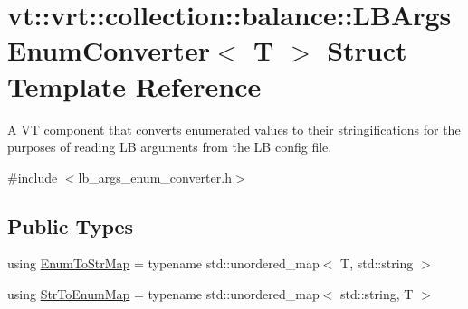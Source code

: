 \hypertarget{structvt_1_1vrt_1_1collection_1_1balance_1_1_l_b_args_enum_converter}{}\section{vt\+:\+:vrt\+:\+:collection\+:\+:balance\+:\+:L\+B\+Args\+Enum\+Converter$<$ T $>$ Struct Template Reference}
\label{structvt_1_1vrt_1_1collection_1_1balance_1_1_l_b_args_enum_converter}


A VT component that converts enumerated values to their stringifications for the purposes of reading LB arguments from the LB config file.  




{\ttfamily \#include $<$lb\+\_\+args\+\_\+enum\+\_\+converter.\+h$>$}

\subsection*{Public Types}
\begin{DoxyCompactItemize}
\item 
using \hyperlink{structvt_1_1vrt_1_1collection_1_1balance_1_1_l_b_args_enum_converter_ab4e2b0c525c1ea76f18f2ff45733f3c4}{Enum\+To\+Str\+Map} = typename std\+::unordered\+\_\+map$<$ T, std\+::string $>$
\item 
using \hyperlink{structvt_1_1vrt_1_1collection_1_1balance_1_1_l_b_args_enum_converter_a4addf8d7b128d0e5de627e60b4c299bf}{Str\+To\+Enum\+Map} = typename std\+::unordered\+\_\+map$<$ std\+::string, T $>$
\end{DoxyCompactItemize}
